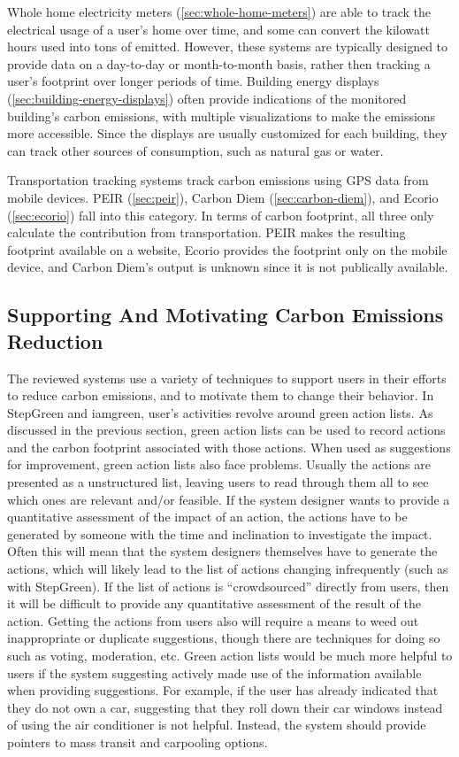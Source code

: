 Whole home electricity meters (\autoref{sec:whole-home-meters}) are able to track the electrical usage of a user's home over time, and some can convert the kilowatt hours used into tons of \COtwo emitted. However, these systems are typically designed to provide data on a day-to-day or month-to-month basis, rather then tracking a user's footprint over longer periods of time. Building energy displays (\autoref{sec:building-energy-displays}) often provide indications of the monitored building's carbon emissions, with multiple visualizations to make the emissions more accessible. Since the displays are usually customized for each building, they can track other sources of consumption, such as natural gas or water.

Transportation tracking systems track carbon emissions using GPS data from mobile devices. PEIR (\autoref{sec:peir}), Carbon Diem (\autoref{sec:carbon-diem}), and Ecorio (\autoref{sec:ecorio}) fall into this category. In terms of carbon footprint, all three only calculate the contribution from transportation. PEIR makes the resulting footprint available on a website, Ecorio provides the footprint only on the mobile device, and Carbon Diem's output is unknown since it is not publically available.

\subsection{Supporting And Motivating Carbon Emissions Reduction}

The reviewed systems use a variety of techniques to support users in their efforts to reduce carbon emissions, and to motivate them to change their behavior. In StepGreen and iamgreen, user's activities revolve around green action lists. As discussed in the previous section, green action lists can be used to record actions and the carbon footprint associated with those actions. When used as suggestions for improvement, green action lists also face problems. Usually the actions are presented as a unstructured list, leaving users to read through them all to see which ones are relevant and/or feasible. If the system designer wants to provide a quantitative assessment of the impact of an action, the actions have to be generated by someone with the time and inclination to investigate the impact. Often this will mean that the system designers themselves have to generate the actions, which will likely lead to the list of actions changing infrequently (such as with StepGreen). If the list of actions is ``crowdsourced'' directly from users, then it will be difficult to provide any quantitative assessment of the result of the action. Getting the actions from users also will require a means to weed out inappropriate or duplicate suggestions, though there are techniques for doing so such as voting, moderation, etc. Green action lists would be much more helpful to users if the system suggesting actively made use of the information available when providing suggestions. For example, if the user has already indicated that they do not own a car, suggesting that they roll down their car windows instead of using the air conditioner is not helpful. Instead, the system should provide pointers to mass transit and carpooling options.

